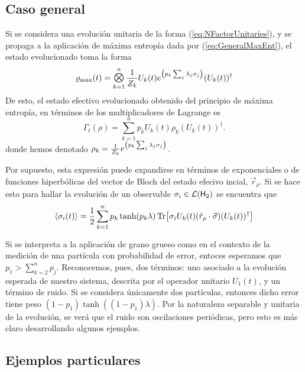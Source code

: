 \subsection{Caso general}

Si se considera una evolución unitaria de la forma (\ref{eq:NFactorUnitaries}), y se propaga a la aplicación de máxima entropía dada por (\ref{eq:GeneralMaxEnt}), el estado evolucionado toma la forma
\begin{equation*}
    \varrho_{\max}(t)=\Motimes_{k=1}^{n}\frac{1}{Z_{k}}U_{k}(t) e^{\qty(p_{k}\sum_{j}\lambda_{j}\pauli{j})} (U_{k}(t))^{\dag}
\end{equation*}
De esto, el estado efectivo evolucionado obtenido del principio de máxima entropía, en términos de los multiplicadores de Lagrange es
\begin{equation}\label{eq:SeparableEvolution}
    \Gamma_{t}(\rho)=\sum_{k=1}^{n}p_{k} U_{k}(t) \rho_{k} (U_{k}(t))^{\dag}.
\end{equation}
donde hemos denotado $\rho_{k}=\frac{1}{Z_{k}}e^{\qty(p_{k}\sum_{j}\lambda_{j}\sigma_{j})}$. 

Por supuesto, esta expresión puede expandirse en términos de exponenciales o de funciones hiperbólicas del vector de Bloch del estado efecivo incial, $\vec{r}_{\rho}$. Si se hace esto para hallar la evolución de un observable $\sigma_{i}\in\mathcal{L}({\sf H}_{2})$ se encuentra que
\begin{equation}\label{eq:SeparableEvolutionExpVal}
    \expval{\sigma_{i}(t)}=\frac{1}{2}\sum_{k=1}^{n}p_{k}\tanh(p_{k}\lambda)\Tr[\sigma_{i}U_{k}(t) (\hat{r}_{\rho}\cdot\vec{\sigma}) (U_{k}(t))^{\dag}]
\end{equation}

Si se interpreta a la aplicación de grano grueso como en el contexto de la medición de una partícula con probabilidad de error, entoces esperamos que  $p_{1}>\sum_{k=2}^{n}p_{j}$. Reconocemos, pues, dos términos: uno asociado a la evolución esperada de nuestro sistema, descrita por el operador unitario $U_{1}(t)$, y un término de ruido. Si se considera únicamente dos partículas, entonces dicho error tiene peso $(1-p_{1})\tanh((1-p_{1})\lambda)$. Por la naturaleza separable y unitaria de la evolución, se verá que el ruido son oscilaciones periódicas, pero esto es más claro desarrollando algunos ejemplos.

\subsection{Ejemplos particulares}

